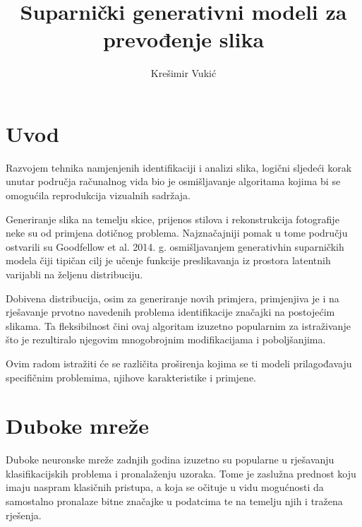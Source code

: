 \documentclass[lmodern, utf8, seminar]{fer}
\begin{document}
\nocite{*}



\title{Suparnički generativni modeli za prevođenje slika}

\author{Krešimir Vukić}

\maketitle


\tableofcontents



\chapter{Uvod}
Razvojem tehnika namjenjenih identifikaciji i analizi slika, logični sljedeći korak unutar područja računalnog vida bio je osmišljavanje algoritama kojima bi se omogućila reprodukcija vizualnih sadržaja. 
\newline

Generiranje slika na temelju skice, prijenos stilova i rekonstrukcija fotografije neke su od primjena dotičnog problema. Najznačajniji pomak u tome području ostvarili su Goodfellow et al. 2014. g. \cite{goodfellow2014generative} osmišljavanjem generativhin suparničkih modela čiji tipičan cilj je učenje funkcije preslikavanja iz prostora latentnih varijabli na željenu distribuciju.

Dobivena distribucija, osim za generiranje novih primjera, primjenjiva je i na rješavanje prvotno navedenih problema identifikacije značajki na postojećim slikama. Ta fleksibilnost čini ovaj algoritam izuzetno popularnim za istraživanje što je rezultiralo njegovim mnogobrojnim modifikacijama i poboljšanjima.
\newline

Ovim radom istražiti će se različita proširenja kojima se ti modeli prilagođavaju specifičnim problemima, njihove karakteristike i primjene.

\chapter{Duboke mreže}
Duboke neuronske mreže zadnjih godina izuzetno su popularne u rješavanju klasifikacijskih problema i pronalaženju uzoraka. Tome je zaslužna prednost koju imaju naspram klasičnih pristupa, a koja se očituje u vidu mogućnosti da samostalno pronalaze bitne značajke u podatcima te na temelju njih i tražena rješenja.
\end{document}
